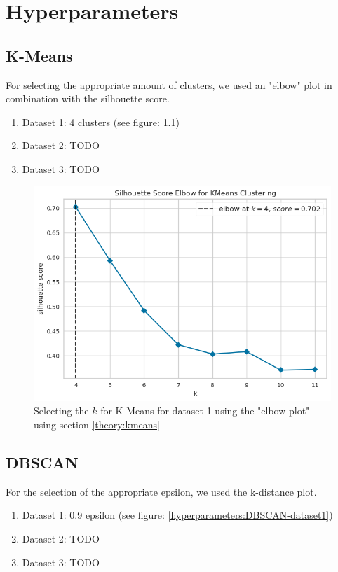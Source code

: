 \chapter{Hyperparameters}
\section{K-Means}
For selecting the appropriate amount of clusters, we used an "elbow" plot in combination with the silhouette score.
\begin{enumerate}
  \item Dataset 1: 4 clusters (see figure: \ref{hyperparameters:k-means-dataset1})
  \item Dataset 2: TODO
  \item Dataset 3: TODO
\end{enumerate}
\begin{figure}
  \includegraphics{Appendix/parameter-selection/selecting-k.png}
  \caption{Selecting the $k$ for K-Means for dataset 1 using the "elbow plot" using section \ref{theory:kmeans}}
  \label{hyperparameters:k-means-dataset1}
\end{figure}
\section{DBSCAN}
For the selection of the appropriate epsilon, we used the k-distance plot.
\begin{enumerate}
  \item Dataset 1: 0.9 epsilon (see figure: \ref{hyperparameters:DBSCAN-dataset1})
  \item Dataset 2: TODO
  \item Dataset 3: TODO
\end{enumerate}

